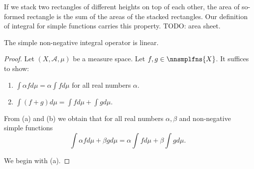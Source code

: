 
\sbasic



\sstart



If we stack two rectangles
of different heights on
top of each other,
the area of so-formed
rectangle is
the sum of the areas
of the stacked rectangles.
Our definition of
integral for simple functions
carries this property.
TODO: area sheet.


\begin{prop}

The simple non-negative
integral operator
is linear.

\begin{proof}

Let $(X, \mathcal{A}, \mu)$
be a measure space.
Let $f, g \in \nnsmplfns{X}$.
It suffices to show:
\begin{enumerate}

  \item
  $\int \alpha f d\mu = \alpha \int f d\mu$
  for all real numbers $\alpha$.

  \item
  $\int (f + g) d\mu = \int f d\mu + \int g d \mu$.
\end{enumerate}
From (a) and (b) we obtain that
for all real numbers $\alpha, \beta$
and non-negative simple functions
\[
  \int \alpha fd\mu + \beta g d\mu= \alpha \int f d\mu+ \beta \int g d\mu.
\]

We begin with (a).
\end{proof}

\end{prop}

\strats
